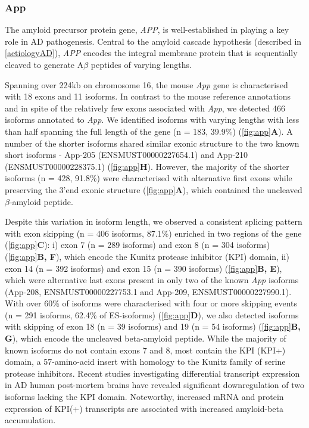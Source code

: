 \newpage
\subsubsection{App}
The amyloid precursor protein gene, \textit{APP}, is well-established in playing a key role in AD pathogenesis. Central to the amyloid cascade hypothesis (described in \cref{aetiologyAD}), \textit{APP} encodes the integral membrane protein that is sequentially cleaved to generate A$\beta$ peptides of varying lengths. 

Spanning over 224kb on chromosome 16, the mouse \textit{App} gene is characterised with 18 exons and 11 isoforms. In contrast to the mouse reference annotations and in spite of the relatively few exons associated with \textit{App}, we detected 466 isoforms annotated to \textit{App}. We identified isoforms with varying lengths with less than half spanning the full length of the gene (n = 183, 39.9\%) (\cref{fig:app}\textbf{A}). A number of the shorter isoforms shared similar exonic structure to the two known short isoforms - App-205 (ENSMUST00000227654.1) and App-210 (ENSMUST00000228375.1) (\cref{fig:app}\textbf{H}). However, the majority of the shorter isoforms (n = 428, 91.8\%) were characterised with alternative first exons while preserving the 3'end exonic structure (\cref{fig:app}\textbf{A}), which contained the uncleaved $\beta$-amyloid peptide. 

Despite this variation in isoform length, we observed a consistent splicing pattern with exon skipping (n = 406 isoforms, 87.1\%) enriched in two regions of the gene (\cref{fig:app}\textbf{C}): i) exon 7 (n = 289 isoforms) and exon 8 (n = 304 isoforms) (\cref{fig:app}\textbf{B, F}), which encode the Kunitz protease inhibitor (KPI) domain, ii) exon 14 (n = 392 isoforms) and exon 15 (n = 390 isoforms) (\cref{fig:app}\textbf{B, E}), which were alternative last exons present in only two of the known \textit{App} isoforms (App-208, ENSMUST00000227753.1 and App-209, ENSMUST00000227990.1). With over 60\% of isoforms were characterised with four or more skipping events (n = 291 isoforms, 62.4\% of ES-isoforms) (\cref{fig:app}\textbf{D}), we also detected isoforms with skipping of exon 18 (n = 39 isoforms) and 19 (n = 54 isoforms) (\cref{fig:app}\textbf{B, G}), which encode the uncleaved beta-amyloid peptide. While the majority of known isoforms do not contain exons 7 and 8, most contain the KPI (KPI+) domain, a 57-amino-acid insert with homology to the Kunitz family of serine protease inhibitors. Recent studies investigating differential transcript expression in AD human post-mortem brains have revealed significant downregulation of two isoforms lacking the KPI domain\cite{Marques-Coelho2021}. Noteworthy, increased mRNA and protein expression of KPI(+) transcripts are associated with increased amyloid-beta accumulation\cite{Zhang2011}. 

